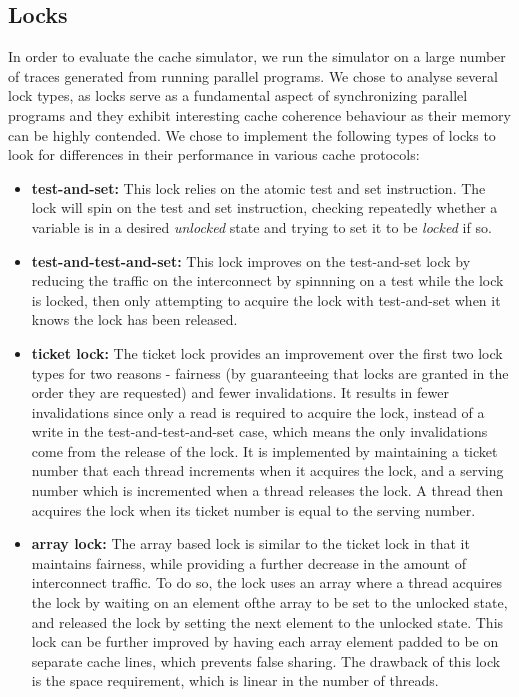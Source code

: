 \documentclass{article}
\begin{document}
\subsection{Locks}
In order to evaluate the cache simulator, we run the simulator on a large number of traces generated from running parallel programs. We chose to analyse several lock types, as locks serve as a fundamental aspect of synchronizing parallel programs and they exhibit interesting cache coherence behaviour as their memory can be highly contended.  We chose to implement the following types of locks to look for differences in their performance in various cache protocols:
\begin{itemize}
    \item {\bf test-and-set:} This lock relies on the atomic test and set instruction.  The lock will spin on the test and set instruction, checking repeatedly whether a variable is in a desired {\it unlocked} state and trying to set it to be {\it locked} if so.
    \item {\bf test-and-test-and-set:} This lock improves on the test-and-set lock by reducing the traffic on the interconnect by spinnning on a test while the lock is locked, then only attempting to acquire the lock with test-and-set when it knows the lock has been released.
    \item {\bf ticket lock:}  The ticket lock provides an improvement over the first two lock types for two reasons - fairness (by guaranteeing that locks are granted in the order they are requested) and fewer invalidations.  It results in fewer invalidations since only a read is required to acquire the lock, instead of a write in the test-and-test-and-set case, which means the only invalidations come from the release of the lock. It is implemented by maintaining a ticket number that each thread increments when it acquires the lock, and a serving number which is incremented when a thread releases the lock.  A thread then acquires the lock when its ticket number is equal to the serving number.
    \item {\bf array lock:} The array based lock is similar to the ticket lock in that it maintains fairness, while providing a further decrease in the amount of interconnect traffic.  To do so, the lock uses an array where a thread acquires the lock by waiting on an element ofthe array to be set to the unlocked state, and released the lock by setting the next element to the unlocked state. This lock can be further improved by having each array element padded to be on separate cache lines, which prevents false sharing.  The drawback of this lock is the space requirement, which is linear in the number of threads.
\end{itemize}
\end{document}
